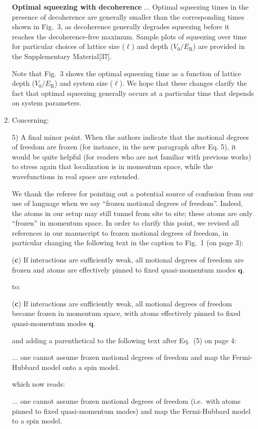 \documentclass[reprint,onecolumn,12pt]{revtex4-2}
\renewcommand{\t}{\text} %
\renewcommand{\v}{\bm} %
\newcommand{\blue}[1]{{\color{blue} #1}}
\newcommand{\red}[1]{{\color{red} #1}}
\newcommand{\green}[1]{{\color{ForestGreen} #1}}
\begin{document}
\begin{enumerate}
  \green{{\bf Optimal squeezing with decoherence} ... Optimal
    squeezing times in the presence of decoherence are generally
    smaller than the corresponding times shown in Fig.~3, as
    decoherence generally degrades squeezing before it reaches the
    decoherence-free maximum.  Sample plots of squeezing over time for
    particular choices of lattice size ($\ell$) and depth
    ($V_0/E_{\t{R}}$) are provided in the Supplementary
    Material[37].}

  Note that Fig.~3 shows the optimal squeezing time as a function of
  lattice depth ($V_0/E_{\t{R}}$) and system size ($\ell$).  We hope
  that these changes clarify the fact that optimal squeezing generally
  occurs at a particular time that depends on system parameters.


\item Concerning:

  \blue{5) A final minor point. When the authors indicate that the
    motional degrees of freedom are frozen (for instance, in the new
    paragraph after Eq. 5), it would be quite helpful (for readers who
    are not familiar with previous works) to stress again that
    localization is in momentum space, while the wavefunctions in real
    space are extended.}

  We thank the referee for pointing out a potential source of
  confusion from our use of language when we say ``frozen motional
  degrees of freedom''.  Indeed, the atoms in our setup may still
  tunnel from site to site; these atoms are only ``frozen'' in
  momentum space.  In order to clarify this point, we revised all
  references in our manuscript to frozen motional degrees of freedom,
  in particular changing the following text in the caption to Fig.~1
  (on page 3):

  \red{({\bf c}) If interactions are sufficiently weak, all motional
    degrees of freedom are frozen and atoms are effectively pinned to
    fixed quasi-momentum modes $\v q$.}

  to:

  \green{({\bf c}) If interactions are sufficiently weak, all motional
    degrees of freedom become frozen in momentum space, with atoms
    effectively pinned to fixed quasi-momentum modes $\v q$.}

  and adding a parenthetical to the following text after Eq.~(5) on
  page 4:

  \red{... one cannot assume frozen motional degrees of freedom and
    map the Fermi-Hubbard model onto a spin model.}

  which now reads:

  \green{... one cannot assume frozen motional degrees of freedom
    (i.e.~with atoms pinned to fixed quasi-momentum modes) and map the
    Fermi-Hubbard model to a spin model.}


\end{enumerate}
\end{document}
